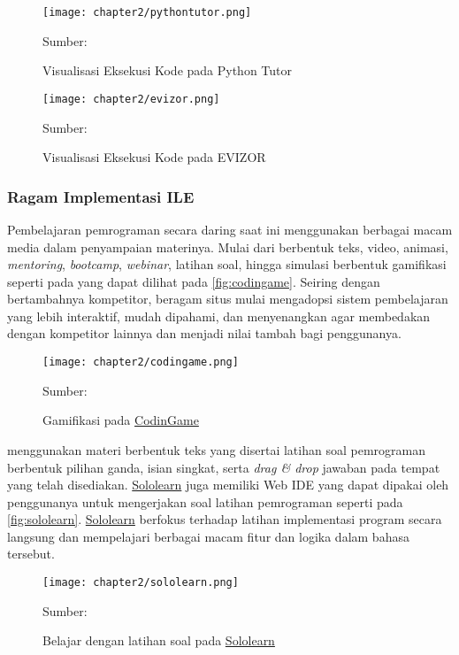 \begin{figure}[H]
  \centering
  \texttt{[image: chapter2/pythontutor.png]}
  \caption{Visualisasi Eksekusi Kode pada Python Tutor} \label{fig:pythontutor}
  Sumber: \textcite{guo2013pythontutor}
\end{figure}

\begin{figure}[H]
  \centering
  \texttt{[image: chapter2/evizor.png]}
  \caption{Visualisasi Eksekusi Kode pada EVIZOR} \label{fig:evizor}
  Sumber: \textcite{moons2013pilot}
\end{figure}

\subsubsection{Ragam Implementasi ILE} \label{sssec:ragam-implementasi-ile}
Pembelajaran pemrograman secara daring saat ini menggunakan berbagai macam media dalam penyampaian materinya. Mulai dari berbentuk teks, video, animasi, \textit{mentoring}, \textit{bootcamp}, \textit{webinar}, latihan soal, hingga simulasi berbentuk gamifikasi seperti pada \textcite{codingame2021media} yang dapat dilihat pada \autoref{fig:codingame}. Seiring dengan bertambahnya kompetitor, beragam situs mulai mengadopsi sistem pembelajaran yang lebih interaktif, mudah dipahami, dan menyenangkan agar membedakan dengan kompetitor lainnya dan menjadi nilai tambah bagi penggunanya.

\begin{figure}[H]
  \centering
  \texttt{[image: chapter2/codingame.png]}
  \caption{\label{fig:codingame}Gamifikasi pada \href{https://www.codingame.com}{CodinGame}}
  Sumber: \textcite{codingame2021media}
\end{figure}

\textcite{sololearn2021media} menggunakan materi berbentuk teks yang disertai latihan soal pemrograman berbentuk pilihan ganda, isian singkat, serta \textit{drag \& drop} jawaban pada tempat yang telah disediakan. \href{https://www.sololearn.com}{Sololearn} juga memiliki Web IDE yang dapat dipakai oleh penggunanya untuk mengerjakan soal latihan pemrograman seperti pada \autoref{fig:sololearn}. \href{https://www.sololearn.com}{Sololearn} berfokus terhadap latihan implementasi program secara langsung dan mempelajari berbagai macam fitur dan logika dalam bahasa tersebut.

\begin{figure}[H]
  \centering
  \texttt{[image: chapter2/sololearn.png]}
  \caption{\label{fig:sololearn}Belajar dengan latihan soal pada \href{https://www.sololearn.com}{Sololearn}}
  Sumber: \textcite{sololearn2021media}
\end{figure}

